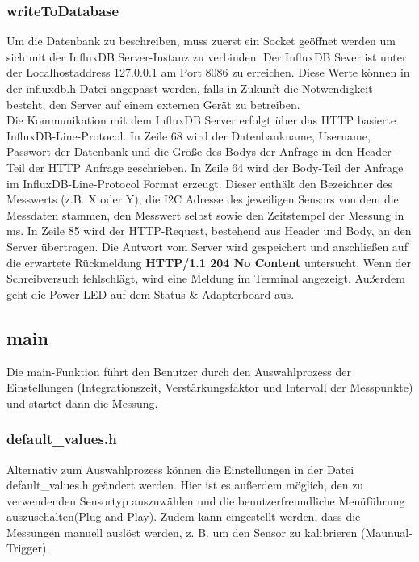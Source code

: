 \subsubsection{writeToDatabase}
Um die Datenbank zu beschreiben, muss zuerst ein Socket geöffnet werden um sich mit der InfluxDB Server-Instanz  zu verbinden.
Der InfluxDB Sever ist unter der Localhostaddress 127.0.0.1 am Port 8086 zu erreichen.
	Diese Werte können in der influxdb.h Datei angepasst werden, falls in Zukunft die Notwendigkeit besteht, den Server auf einem externen Gerät zu betreiben.\\
Die Kommunikation mit dem InfluxDB Server erfolgt über das HTTP basierte InfluxDB-Line-Protocol.
In Zeile 68 wird der Datenbankname, Username,  Passwort der Datenbank und die Größe des Bodys der Anfrage in den Header-Teil der HTTP Anfrage geschrieben.
In Zeile 64 wird der Body-Teil der Anfrage im InfluxDB-Line-Protocol Format erzeugt. Dieser enthält den Bezeichner des Messwerts (z.B. X oder Y), die I2C Adresse des jeweiligen Sensors von dem die Messdaten stammen, den Messwert selbst sowie den Zeitstempel der Messung in ms.	
In Zeile 85 wird der HTTP-Request, bestehend aus Header und Body, an den Server übertragen.
Die Antwort vom Server wird gespeichert und anschließen auf die erwartete Rückmeldung \textbf{HTTP/1.1 204 No Content } untersucht. Wenn der Schreibversuch fehlschlägt, wird eine Meldung im Terminal angezeigt.
Außerdem geht die Power-LED auf dem Status \& Adapterboard aus.
\subsection{main}\label{main}
Die main-Funktion führt den Benutzer durch den Auswahlprozess der Einstellungen (Integrationszeit, Verstärkungsfaktor und Intervall der Messpunkte) und startet dann die Messung.\\
\subsubsection{default\_values.h}
\noindent Alternativ zum Auswahlprozess können die Einstellungen in der Datei default\_values.h geändert werden. Hier ist es außerdem möglich, den zu verwendenden Sensortyp auszuwählen und die benutzerfreundliche Menüführung auszuschalten(Plug-and-Play).
Zudem kann eingestellt werden, dass die Messungen manuell auslöst werden, z. B. um den Sensor zu kalibrieren (Maunual-Trigger).\\



